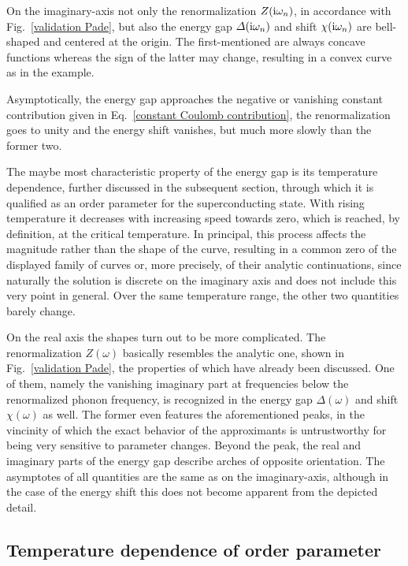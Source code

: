 On the imaginary-axis not only the renormalization $Z(\mathrm i \omega_n)$, in
accordance with Fig.~\ref{validation Pade}, but also the energy gap $\varDelta(\mathrm i
\omega_n)$ and shift $\chi(\mathrm i \omega_n)$ are bell-shaped and centered at the
origin. The first-mentioned are always concave functions whereas the sign of
the latter may change, resulting in a convex curve as in the example.

Asymptotically, the energy gap approaches the negative or vanishing constant
 contribution given in Eq.~\ref{constant Coulomb contribution},
the renormalization goes to unity and the energy shift vanishes, but much more
slowly than the former two.

The maybe most characteristic property of the energy gap is its temperature
dependence, further discussed in the subsequent section, through which it is
qualified as an order parameter for the superconducting state. With rising
temperature it decreases with increasing speed towards zero, which is reached,
by definition, at the critical temperature. In principal, this process affects
the magnitude rather than the shape of the curve, resulting in a common zero of
the displayed family of curves or, more precisely, of their analytic
continuations, since naturally the solution is discrete on the imaginary axis
and does not include this very point in general. Over the same temperature
range, the other two quantities barely change.

On the real axis the shapes turn out to be more complicated. The renormalization
$Z(\omega)$ basically resembles the analytic one, shown in Fig.~\ref{validation
Pade}, the properties of which have already been discussed. One of them, namely
the vanishing imaginary part at frequencies below the renormalized phonon
frequency, is recognized in the energy gap $\Delta(\omega)$ and shift
$\chi(\omega)$ as well. The former even features the aforementioned peaks, in
the vincinity of which the exact behavior of the  approximants is
untrustworthy for being very sensitive to parameter changes. Beyond the peak,
the real and imaginary parts of the energy gap describe arches of opposite
orientation. The asymptotes of all quantities are the same as on the
imaginary-axis, although in the case of the energy shift this does not become
apparent from the depicted detail.

\subsection{Temperature dependence of order parameter}
\label{temperature dependence of order parameter}

